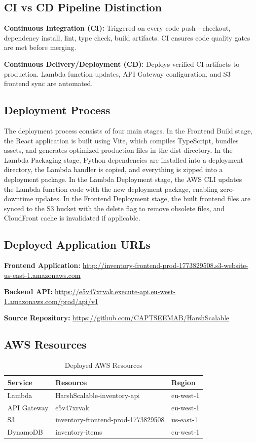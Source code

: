 \documentclass[conference]{IEEEtran}
\begin{document}
\subsection{CI vs CD Pipeline Distinction}

\textbf{Continuous Integration (CI):} Triggered on every code push---checkout, dependency install, lint, type check, build artifacts. CI ensures code quality gates are met before merging.

\textbf{Continuous Delivery/Deployment (CD):} Deploys verified CI artifacts to production. Lambda function updates, API Gateway configuration, and S3 frontend sync are automated.

\subsection{Deployment Process}

The deployment process consists of four main stages. In the Frontend Build stage, the React application is built using Vite, which compiles TypeScript, bundles assets, and generates optimized production files in the dist directory. In the Lambda Packaging stage, Python dependencies are installed into a deployment directory, the Lambda handler is copied, and everything is zipped into a deployment package. In the Lambda Deployment stage, the AWS CLI updates the Lambda function code with the new deployment package, enabling zero-downtime updates. In the Frontend Deployment stage, the built frontend files are synced to the S3 bucket with the delete flag to remove obsolete files, and CloudFront cache is invalidated if applicable.

\subsection{Deployed Application URLs}

\textbf{Frontend Application:} \url{http://inventory-frontend-prod-1773829508.s3-website-us-east-1.amazonaws.com}

\textbf{Backend API:} \url{https://e5v47xrvak.execute-api.eu-west-1.amazonaws.com/prod/api/v1}

\textbf{Source Repository:} \url{https://github.com/CAPTSEEMAB/HarshScalable}

\subsection{AWS Resources}

\begin{table}[!t]
\caption{Deployed AWS Resources}
\centering
\small
\begin{tabular}{p{2.0cm}p{2.5cm}p{2.5cm}}
\toprule
\textbf{Service} & \textbf{Resource} & \textbf{Region} \\
\midrule
Lambda & HarshScalable-inventory-api & eu-west-1 \\
API Gateway & e5v47xrvak & eu-west-1 \\
S3 & inventory-frontend-prod-1773829508 & us-east-1 \\
DynamoDB & inventory-items & eu-west-1 \\
\bottomrule
\end{tabular}
\end{table}
\end{document}
